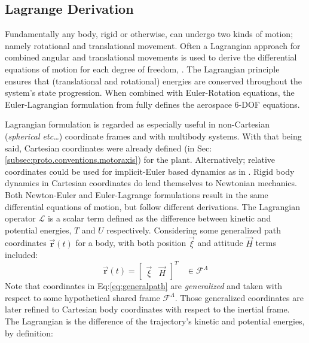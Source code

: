 \subsection{Lagrange Derivation}
\label{subsec:dynamics.rigidbody.lagrange}
Fundamentally any body, rigid or otherwise, can undergo two kinds of motion; namely rotational and translational movement. Often a Lagrangian approach for combined angular and translational movements is used to derive the differential equations of motion for each degree of freedom, \cite{classicaldynamics,rotationrigidbody}. The Lagrangian principle ensures that (translational and rotational) energies are conserved throughout the system's state progression. When combined with Euler-Rotation equations, the Euler-Lagrangian formulation from \cite{lagrange-formalism} fully defines the aerospace 6-DOF equations.
\par
Lagrangian formulation is regarded as especially useful in non-Cartesian (\emph{spherical etc\ldots}) coordinate frames and with multibody systems. With that being said, Cartesian coordinates were already defined (in Sec:\ref{subsec:proto.conventions.motoraxis}) for the plant. Alternatively; relative coordinates could be used for implicit-Euler based dynamics as in \cite{autonomousrobotseuler}. Rigid body dynamics in Cartesian coordinates do lend themselves to Newtonian mechanics. Both Newton-Euler and Euler-Lagrange formulations result in the same differential equations of motion, but follow different derivations. The Lagrangian operator $\mathcal{L}$ is a scalar term defined as the difference between kinetic and potential energies, $T$ and $U$ respectively. Considering some generalized path coordinates $\vec{\mathbf{r}}(t)$ for a body, with both position $\vec{\xi}$ and attitude $\vec{H}$ terms included:
\begin{equation}\label{eq:generalpath}
\vec{\mathbf{r}}(t)=\begin{bmatrix}
\vec{\xi} & \vec{H}
\end{bmatrix}^T~~~~\in\mathcal{F}^{\Lambda}
\end{equation}
Note that coordinates in Eq:\ref{eq:generalpath} are \emph{generalized} and taken with respect to some hypothetical shared frame $\mathcal{F}^{\Lambda}$. Those generalized coordinates are later refined to Cartesian body coordinates with respect to the inertial frame. The Lagrangian is the difference of the trajectory's kinetic and potential energies, by definition:

